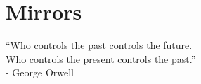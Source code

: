 \chapter{Mirrors}

\begin{displayquote}
	\centering
	“Who controls the past controls the future.
	\\ Who controls the present controls the past.”
	\\ - George Orwell 
	
\end{displayquote}


